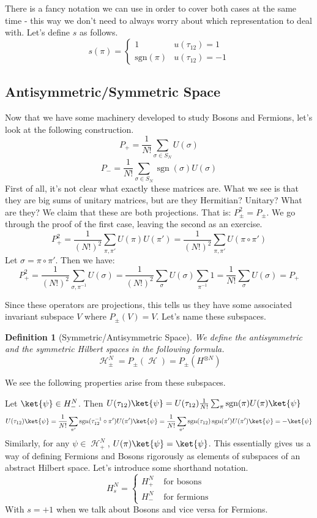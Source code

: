 \documentclass{article}
\DeclareMathOperator{\Hh}{{\mathcal{H}}}
\DeclareMathOperator{\sgn}{\textrm{sgn}}
\newtheorem{defn}{Definition}
\begin{document}
There is a fancy notation we can use in order to cover both cases at the same time - this way we don't need to always worry about which representation to deal with. Let's define $s$ as follows.
\[s(\pi)=\begin{cases}1 & u(\tau_{12})=1\\
\textrm{sgn}(\pi) & u(\tau_{12})=-1
\end{cases}\]
\pagebreak

\subsection{Antisymmetric/Symmetric Space}
Now that we have some machinery developed to study Bosons and Fermions, let's look at the following construction.
\begin{equation}
P_{+} = \frac{1}{N!}\sum_{\sigma \in S_N} U(\sigma)
\end{equation}
\begin{equation}
P_{-} = \frac{1}{N!}\sum_{\sigma \in S_N} \sgn(\sigma) U(\sigma)
\end{equation}
First of all, it's not clear what exactly these matrices are. What we see is that they are big sums of unitary matrices, but are they Hermitian? Unitary? What are they? We claim that these are both projections. That is: $P_{\pm}^2 = P_{\pm}$. We go through the proof of the first case, leaving the second as an exercise.
\[P_+^2 = \frac{1}{(N!)^2} \sum_{\pi,\pi'}U(\pi)U(\pi') = \frac{1}{(N!)^2}\sum_{\pi,\pi'} U(\pi \circ \pi')\]
Let $\sigma = \pi\circ \pi'$. Then we have:
\[P_+^2 = \frac{1}{(N!)^2} \sum_{\sigma,\pi^{-1}}U(\sigma) = \frac{1}{(N!)^2}\sum_{\sigma}U(\sigma) \sum_{\pi^{-1}}1 = \frac{1}{N!}\sum_{\sigma} U(\sigma) = P_+\]

Since these operators are projections, this tells us they have some associated invariant subspace $V$ where $P_\pm (V) = V$. Let's name these subspaces.
\begin{defn}[Symmetric/Antisymmetric Space]
We define the antisymmetric and the symmetric Hilbert spaces in the following formula.
\begin{equation}
\Hh_\pm^N = P_\pm(\Hh) = P_\pm(H^{\otimes N})
\end{equation}
\end{defn}
We see the following properties arise from these subspaces. 

Let $\ket{\psi} \in H_-^N$. Then $U(\tau_{12}) \ket{\psi} = U(\tau_{12}) \frac{1}{N!}\sum_{\pi}\sgn(\pi)U(\pi) \ket{\psi}$
\[U(\tau_{12})\ket{\psi} = \frac{1}{N!}\sum_{\pi'}\sgn(\tau_{12}^{-1}\circ \pi')U(\pi') \ket{\psi} = \frac{1}{N!}\sum_{\pi'}\sgn(\tau_{12})\sgn(\pi')U(\pi')\ket{\psi}=-\ket{\psi}\] Similarly, for any $\psi \in \Hh_+^N$, $U(\pi)\ket{\psi} = \ket{\psi}$. This essentially gives us a way of defining Fermions and Bosons rigorously as elements of subspaces of an abstract Hilbert space. Let's introduce some shorthand notation.
\[H_s^N = \begin{cases}H_+^N & \textrm{ for bosons} \\ H_-^N & \textrm{ for fermions}\end{cases}\]
With $s = +1$ when we talk about Bosons and vice versa for Fermions.
\end{document}
